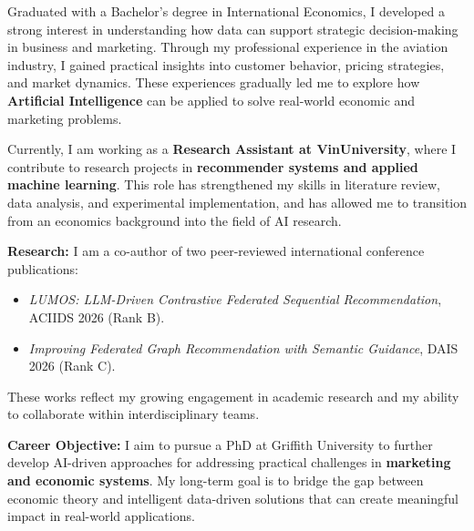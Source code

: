%
%
%

Graduated with a Bachelor’s degree in International Economics, I developed a strong interest in understanding how data can support strategic decision-making in business and marketing. Through my professional experience in the aviation industry, I gained practical insights into customer behavior, pricing strategies, and market dynamics. These experiences gradually led me to explore how \textbf{Artificial Intelligence} can be applied to solve real-world economic and marketing problems.

Currently, I am working as a \textbf{Research Assistant at VinUniversity}, where I contribute to research projects in \textbf{recommender systems and applied machine learning}. This role has strengthened my skills in literature review, data analysis, and experimental implementation, and has allowed me to transition from an economics background into the field of AI research.

\textbf{Research:} I am a co-author of two peer-reviewed international conference publications:
\begin{itemize}
    \item \textit{LUMOS: LLM-Driven Contrastive Federated Sequential Recommendation}, ACIIDS 2026 (Rank B).
    \item \textit{Improving Federated Graph Recommendation with Semantic Guidance}, DAIS 2026 (Rank C).
\end{itemize}
These works reflect my growing engagement in academic research and my ability to collaborate within interdisciplinary teams.

\textbf{Career Objective:} I aim to pursue a PhD at Griffith University to further develop AI-driven approaches for addressing practical challenges in \textbf{marketing and economic systems}. My long-term goal is to bridge the gap between economic theory and intelligent data-driven solutions that can create meaningful impact in real-world applications.